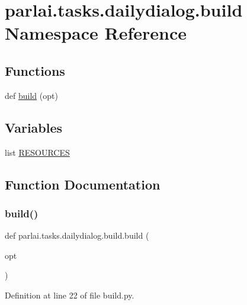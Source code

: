 \hypertarget{namespaceparlai_1_1tasks_1_1dailydialog_1_1build}{}\section{parlai.\+tasks.\+dailydialog.\+build Namespace Reference}
\label{namespaceparlai_1_1tasks_1_1dailydialog_1_1build}
\subsection*{Functions}
\begin{DoxyCompactItemize}
\item 
def \hyperlink{namespaceparlai_1_1tasks_1_1dailydialog_1_1build_a04bbf27e3a854b42e42d2b6b3c4707a0}{build} (opt)
\end{DoxyCompactItemize}
\subsection*{Variables}
\begin{DoxyCompactItemize}
\item 
list \hyperlink{namespaceparlai_1_1tasks_1_1dailydialog_1_1build_ac23bf3be98da838ec5957c457a66c2e6}{R\+E\+S\+O\+U\+R\+C\+ES}
\end{DoxyCompactItemize}


\subsection{Function Documentation}
\mbox{\label{namespaceparlai_1_1tasks_1_1dailydialog_1_1build_a04bbf27e3a854b42e42d2b6b3c4707a0}} 
\subsubsection{\texorpdfstring{build()}{build()}}
{\footnotesize\ttfamily def parlai.\+tasks.\+dailydialog.\+build.\+build (\begin{DoxyParamCaption}\item[{}]{opt }\end{DoxyParamCaption})}



Definition at line 22 of file build.\+py.


